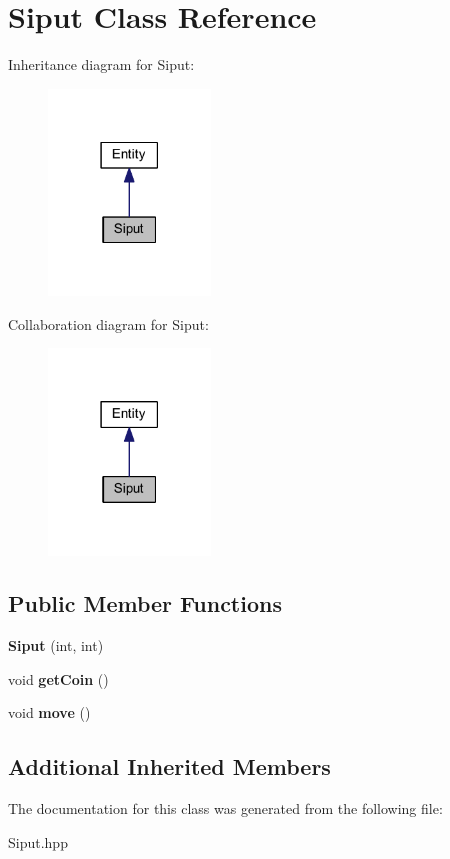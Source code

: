 \hypertarget{class_siput}{}\section{Siput Class Reference}
\label{class_siput}


Inheritance diagram for Siput\+:
\nopagebreak
\begin{figure}[H]
\begin{center}
\leavevmode
\includegraphics[width=122pt]{class_siput__inherit__graph}
\end{center}
\end{figure}


Collaboration diagram for Siput\+:
\nopagebreak
\begin{figure}[H]
\begin{center}
\leavevmode
\includegraphics[width=122pt]{class_siput__coll__graph}
\end{center}
\end{figure}
\subsection*{Public Member Functions}
\begin{DoxyCompactItemize}
\item 
\mbox{\label{class_siput_abbbf9701e21784f1e08d3c3aa92c0105}} 
{\bfseries Siput} (int, int)
\item 
\mbox{\label{class_siput_a4f5cceefab1fdfb494c7eebaabcd0300}} 
void {\bfseries get\+Coin} ()
\item 
\mbox{\label{class_siput_a40de61cd661fe26389b4f53e071e44d4}} 
void {\bfseries move} ()
\end{DoxyCompactItemize}
\subsection*{Additional Inherited Members}


The documentation for this class was generated from the following file\+:\begin{DoxyCompactItemize}
\item 
Siput.\+hpp\end{DoxyCompactItemize}
